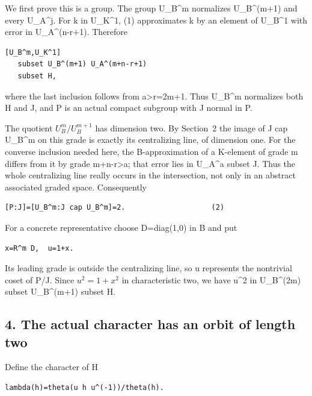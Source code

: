 We first prove this is a group. The group U\_B\^{}m normalizes
U\_B\^{}(m+1) and every U\_A\^{}j. For k in U\_K\^{}1, (1) approximates
k by an element of U\_B\^{}1 with error in U\_A\^{}(n-r+1). Therefore

\begin{Verbatim}[fontsize=\small,breaklines=true,breakanywhere=true]
[U_B^m,U_K^1]
   subset U_B^(m+1) U_A^(m+n-r+1)
   subset H,
\end{Verbatim}

where the last inclusion follows from a\textgreater r=2m+1. Thus
U\_B\^{}m normalizes both H and J, and P is an actual compact subgroup
with J normal in P.

The quotient \(U_B^m/U_B^{m+1}\) has dimension two. By
Section~2 the image of J cap U\_B\^{}m on this grade is exactly its
centralizing line, of dimension one. For the converse inclusion needed
here, the B-approximation of a K-element of grade m differs from it by
grade m+n-r\textgreater a; that error lies in U\_A\^{}a subset J. Thus
the whole centralizing line really occurs in the intersection, not only
in an abstract associated graded space. Consequently

\begin{Verbatim}[fontsize=\small,breaklines=true,breakanywhere=true]
[P:J]=[U_B^m:J cap U_B^m]=2.                    (2)
\end{Verbatim}

For a concrete representative choose D=diag(1,0) in B and put

\begin{Verbatim}[fontsize=\small,breaklines=true,breakanywhere=true]
x=R^m D,  u=1+x.
\end{Verbatim}

Its leading grade is outside the centralizing line, so u represents the
nontrivial coset of P/J. Since \(u^2=1+x^2\) in
characteristic two, we have u\^{}2 in U\_B\^{}(2m) subset U\_B\^{}(m+1)
subset H.

\hypertarget{rank4-the-actual-character-has-an-orbit-of-length-two}{%
\subsection{4. The actual character has an orbit of length
two}\label{rank4-the-actual-character-has-an-orbit-of-length-two}}

Define the character of H

\begin{Verbatim}[fontsize=\small,breaklines=true,breakanywhere=true]
lambda(h)=theta(u h u^(-1))/theta(h).
\end{Verbatim}

